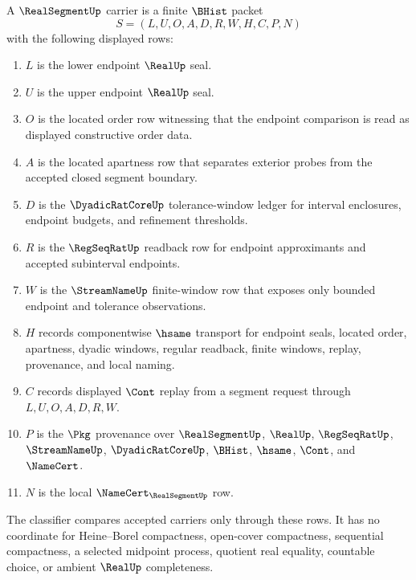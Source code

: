 \begin{definition}
\label{def:real-segment-carrier}
A $\RealSegmentUp$ carrier is a finite $\BHist$ packet
$$
S=(L,U,O,A,D,R,W,H,C,P,N)
$$
with the following displayed rows:
\begin{enumerate}
\item $L$ is the lower endpoint $\RealUp$ seal.
\item $U$ is the upper endpoint $\RealUp$ seal.
\item $O$ is the located order row witnessing that the endpoint comparison is read as displayed constructive order data.
\item $A$ is the located apartness row that separates exterior probes from the accepted closed segment boundary.
\item $D$ is the $\DyadicRatCoreUp$ tolerance-window ledger for interval enclosures, endpoint budgets, and refinement thresholds.
\item $R$ is the $\RegSeqRatUp$ readback row for endpoint approximants and accepted subinterval endpoints.
\item $W$ is the $\StreamNameUp$ finite-window row that exposes only bounded endpoint and tolerance observations.
\item $H$ records componentwise $\hsame$ transport for endpoint seals, located order, apartness, dyadic windows, regular readback, finite windows, replay, provenance, and local naming.
\item $C$ records displayed $\Cont$ replay from a segment request through $L,U,O,A,D,R,W$.
\item $P$ is the $\Pkg$ provenance over $\RealSegmentUp$, $\RealUp$, $\RegSeqRatUp$, $\StreamNameUp$, $\DyadicRatCoreUp$, $\BHist$, $\hsame$, $\Cont$, and $\NameCert$.
\item $N$ is the local $\NameCert_{\RealSegmentUp}$ row.
\end{enumerate}
The classifier compares accepted carriers only through these rows. It has no coordinate for Heine--Borel compactness, open-cover compactness, sequential compactness, a selected midpoint process, quotient real equality, countable choice, or ambient $\RealUp$ completeness.
\end{definition}

